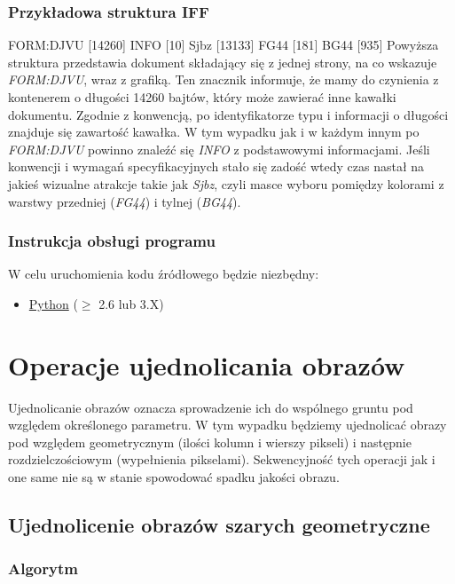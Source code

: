 \documentclass[a4paper,12pt]{book}
\begin{document}
\subsection{Przykładowa struktura IFF}
FORM:DJVU [14260] \newline
\tabto{5mm} INFO [10] \newline
\tabto{5mm} Sjbz [13133] \newline
\tabto{5mm} FG44 [181] \newline
\tabto{5mm} BG44 [935] \newline
\newline
Powyższa struktura przedstawia dokument składający się z jednej strony, na co wskazuje \textit{FORM:DJVU}, wraz z grafiką. Ten znacznik informuje, że mamy do czynienia z kontenerem o długości 14260 bajtów, który może zawierać inne kawałki dokumentu. Zgodnie z konwencją, po identyfikatorze typu i informacji o długości znajduje się zawartość kawałka. W tym wypadku jak i w każdym innym po \textit{FORM:DJVU} powinno znaleźć się \textit{INFO} z podstawowymi informacjami. Jeśli konwencji i wymagań specyfikacyjnych stało się zadość wtedy czas nastał na jakieś wizualne atrakcje takie jak \textit{Sjbz}, czyli masce wyboru pomiędzy kolorami z warstwy przedniej (\textit{FG44}) i tylnej (\textit{BG44}). 
\subsection{Instrukcja obsługi programu}
W celu uruchomienia kodu źródłowego będzie niezbędny: 
\begin{itemize}
	\item \href{https://www.python.org/}{Python} ($\geq$ 2.6 lub 3.X)
\end{itemize}

\chapter{Operacje ujednolicania obrazów}
Ujednolicanie obrazów oznacza sprowadzenie ich do wspólnego gruntu pod względem określonego parametru. W tym wypadku będziemy ujednolicać obrazy pod względem geometrycznym (ilości kolumn i wierszy pikseli) i następnie rozdzielczościowym (wypełnienia pikselami). Sekwencyjność tych operacji jak i one same nie są w stanie spowodować spadku jakości obrazu. 
\section{Ujednolicenie obrazów szarych geometryczne}
\subsection*{Algorytm}
\end{document}
